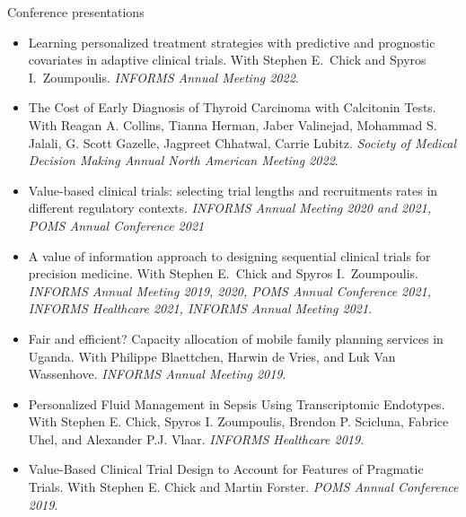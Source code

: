\documentclass{resume}
\begin{document}
\begin{rSection}{Conference presentations}

\begin{itemize}
\item Learning personalized treatment strategies with predictive and prognostic covariates in adaptive clinical trials. With Stephen E.\ Chick and Spyros I.\ Zoumpoulis. \textit{INFORMS Annual Meeting 2022}.
\item The Cost of Early Diagnosis of Thyroid Carcinoma with Calcitonin Tests. With Reagan A. Collins, Tianna Herman, Jaber Valinejad, Mohammad S. Jalali, G. Scott Gazelle, Jagpreet Chhatwal, Carrie Lubitz. \textit{Society of Medical Decision Making Annual North American Meeting 2022}.
\item Value-based clinical trials: selecting trial lengths and recruitments rates in different regulatory contexts. \textit{INFORMS Annual Meeting 2020 and 2021, POMS Annual Conference 2021}
\item A value of information approach to designing sequential clinical trials for precision medicine. With Stephen E.\ Chick and Spyros I.\ Zoumpoulis. \textit{INFORMS Annual Meeting 2019, 2020, POMS Annual Conference 2021, INFORMS Healthcare 2021, INFORMS Annual Meeting 2021}.
\item Fair and efficient? Capacity allocation of mobile family planning services in Uganda. With Philippe Blaettchen, Harwin de Vries, and Luk Van Wassenhove. \textit{INFORMS Annual Meeting 2019}.
\item Personalized Fluid Management in Sepsis Using Transcriptomic Endotypes. With Stephen E. Chick, Spyros I. Zoumpoulis, Brendon P. Scicluna, Fabrice Uhel, and Alexander P.J. Vlaar. \textit{INFORMS Healthcare 2019}.
\item Value-Based Clinical Trial Design to Account for Features of Pragmatic Trials. With Stephen E. Chick and Martin Forster. \textit{POMS Annual Conference 2019}.
\end{itemize}

\end{rSection}
\end{document}
